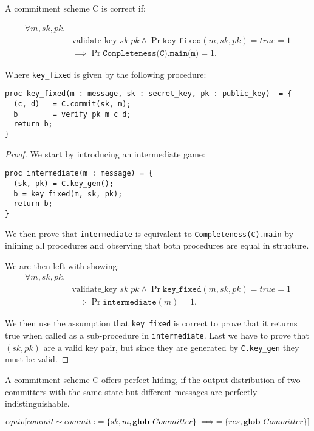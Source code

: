 \begin{lemma}
  A commitment scheme C is correct if:

  \begin{align*}
    \forall m,sk,pk.& \\
    &\text{validate\_key } sk \; pk \land \Pr{\texttt{key\_{fixed}}(m, sk, pk) = true} = 1 \\
    & \implies \Pr{\texttt{Completeness(C).main(m)}} = 1.
  \end{align*}

  Where \texttt{key\_fixed} is given by the following procedure:

\begin{lstlisting}
proc key_fixed(m : message, sk : secret_key, pk : public_key)  = {
  (c, d)   = C.commit(sk, m);
  b        = verify pk m c d;
  return b;
}
\end{lstlisting}
\end{lemma}
\begin{proof}
  We start by introducing an intermediate game:
\begin{lstlisting}
proc intermediate(m : message) = {
  (sk, pk) = C.key_gen();
  b = key_fixed(m, sk, pk);
  return b;
}
\end{lstlisting}
  We then prove that \texttt{intermediate} is equivalent to
  \texttt{Completeness(C).main} by inlining all procedures and observing that
  both procedures are equal in structure.

  We are then left with showing:
  \begin{align*}
    \forall m,sk,pk.& \\
    &\text{validate\_key } sk \; pk \land \Pr{\texttt{key\_{fixed}}(m, sk, pk) = true} = 1 \\
    & \implies \Pr{\texttt{intermediate}(m)} = 1.
  \end{align*}

  We then use the assumption that \texttt{key\_fixed} is correct to prove that
  it returns true when called as a sub-procedure in \texttt{intermediate}. Last
  we have to prove that $(sk, pk)$ are a valid key pair, but since they are
  generated by \texttt{C.key\_gen} they must be valid.
\end{proof}

\begin{definition}
  \label{def:commitment:perfect-hiding}
  A commitment scheme C offers perfect hiding, if the output distribution of two
  committers with the same state but different messages are perfectly
  indistinguishable.

  \[
    equiv[commit \sim commit :\; =\{sk, m, \textbf{glob } Committer\} \implies =\{res, \textbf{glob } Committer\} ]
  \]

\end{definition}

